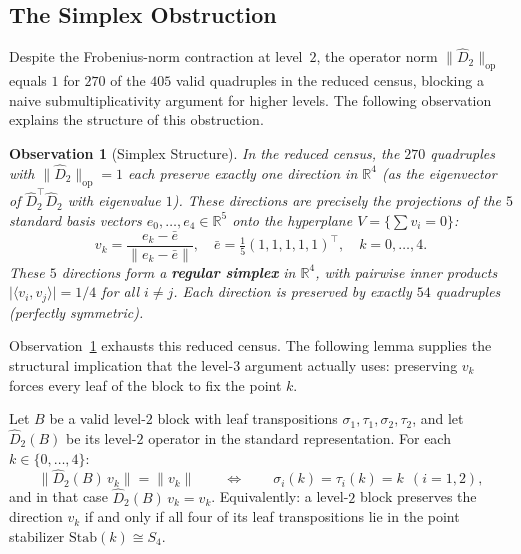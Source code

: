 \documentclass[version=final]{iacrcc}
\newtheorem{observation}[theorem]{Observation}
\newcommand{\norm}[1]{\lVert #1 \rVert}
\newcommand{\abs}[1]{\lvert #1 \rvert}
\newcommand{\opn}[1]{\norm{#1}_{\mathrm{op}}}
\newcommand{\Dhat}{\widehat{D}}
\begin{document}
\subsection{The Simplex Obstruction}
\label{sec:simplex}

Despite the Frobenius-norm contraction at level~$2$, the operator norm
$\opn{\Dhat_2}$ equals $1$ for $270$ of the $405$ valid quadruples in the reduced census,
blocking a naive submultiplicativity argument for higher levels.
The following observation explains the structure of this obstruction.

\begin{observation}[Simplex Structure]
\label{obs:simplex}
In the reduced census, the $270$ quadruples with $\opn{\Dhat_2} = 1$
each preserve exactly one direction
in $\mathbb{R}^4$ (as the eigenvector of $\Dhat_2^\top \Dhat_2$ with eigenvalue $1$).
These directions are precisely the projections of the $5$ standard basis vectors
$e_0, \ldots, e_4 \in \mathbb{R}^5$ onto the hyperplane $V = \{\sum v_i = 0\}$:
\[
v_k = \frac{e_k - \bar{e}}{\norm{e_k - \bar{e}}}, \quad
\bar{e} = \tfrac{1}{5}(1,1,1,1,1)^\top, \quad k = 0, \ldots, 4.
\]
These $5$ directions form a \textbf{regular simplex} in $\mathbb{R}^4$, with
pairwise inner products $\abs{\langle v_i, v_j \rangle} = 1/4$ for all $i \neq j$.
Each direction is preserved by exactly $54$ quadruples (perfectly symmetric).
\end{observation}

Observation~\ref{obs:simplex} exhausts this reduced census. The following lemma supplies the
structural implication that the level-$3$ argument actually uses: preserving
$v_k$ forces every leaf of the block to fix the point $k$.

\begin{lemma}
\label{lem:stab-char}
Let $B$ be a valid level-$2$ block with leaf transpositions
$\sigma_1, \tau_1, \sigma_2, \tau_2$, and let $\Dhat_2(B)$ be its level-$2$
operator in the standard representation. For each $k \in \{0,\dots,4\}$:
\[
\norm{\Dhat_2(B)\, v_k} = \norm{v_k}
\qquad\Longleftrightarrow\qquad
\sigma_i(k) = \tau_i(k) = k \ \ (i = 1,2),
\]
and in that case $\Dhat_2(B)\, v_k = v_k$. Equivalently: a level-$2$ block
preserves the direction $v_k$ if and only if all four of its leaf
transpositions lie in the point stabilizer $\mathrm{Stab}(k) \cong S_4$.
\end{lemma}
\end{document}
